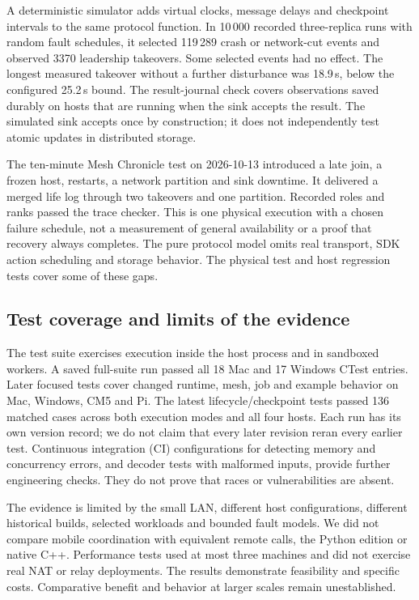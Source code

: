 A deterministic simulator adds virtual clocks, message delays and
checkpoint intervals to the same protocol function. In 10\,000 recorded
three-replica runs with random fault schedules, it selected 119\,289
crash or network-cut events and observed 3370 leadership takeovers.
Some selected events had no effect. The longest measured takeover
without a further disturbance was 18.9\,s, below the configured 25.2\,s
bound. The result-journal check covers observations saved durably on
hosts that are running when the sink accepts the result. The simulated
sink accepts once by construction; it does not independently test atomic
updates in distributed storage.

The ten-minute Mesh Chronicle test on 2026-10-13 introduced a late join,
a frozen host, restarts, a network partition and sink downtime. It
delivered a merged life log through two takeovers and one partition.
Recorded roles and ranks passed the trace checker. This is one physical
execution with a chosen failure schedule, not a measurement of general
availability or a proof that recovery always completes. The pure protocol
model omits real transport, SDK action scheduling and storage behavior.
The physical test and host regression tests cover some of these gaps.

\subsection{Test coverage and limits of the evidence}\label{sec:evaluation-tests}

The test suite exercises execution inside the host process and in
sandboxed workers. A saved full-suite run passed all 18 Mac and 17
Windows CTest entries. Later focused tests cover changed runtime, mesh,
job and example behavior on Mac, Windows, CM5 and Pi. The latest
lifecycle/checkpoint tests passed 136 matched cases across both execution
modes and all four hosts. Each run has its own version record; we do not
claim that every later revision reran every earlier test. Continuous
integration (CI) configurations for detecting memory and concurrency
errors, and decoder tests with malformed inputs, provide further
engineering checks. They do not prove that races or vulnerabilities
are absent.

The evidence is limited by the small LAN, different host configurations,
different historical builds, selected workloads and bounded fault
models. We did not compare mobile coordination with equivalent remote
calls, the Python edition or native C++. Performance tests used at most
three machines and did not exercise real NAT or relay deployments.
The results demonstrate feasibility and specific costs. Comparative
benefit and behavior at larger scales remain unestablished.
